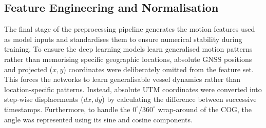  
\subsection{Feature Engineering and Normalisation}
\label{subsec:featureengineering}

The final stage of the preprocessing pipeline generates the motion features used as model inputs and standardises them to ensure numerical stability during training.
To ensure the deep learning models learn generalised motion patterns rather than memorising specific geographic locations, absolute \ac{GNSS} positions and projected ($x, y$) coordinates were deliberately omitted from the feature set. %
This forces the networks to learn generalisable vessel dynamics rather than location-specific patterns. 
Instead, absolute \ac{UTM} coordinates were converted into step-wise displacements ($dx, dy$) by calculating the difference between successive timestamps. Furthermore, to handle the $0^{\circ}/360^{\circ}$ wrap-around of the \ac{COG}, the angle was represented using its sine and cosine components.



  

